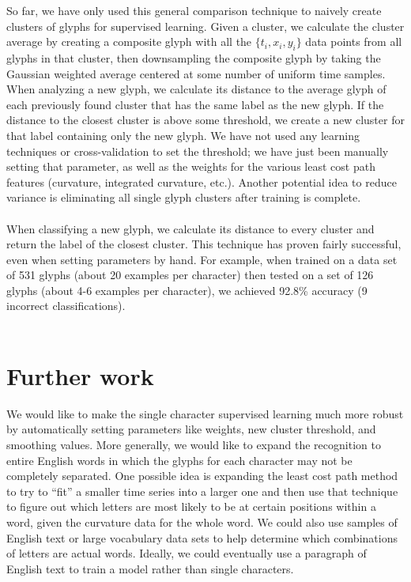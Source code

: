 \documentclass[journal]{IEEEtran}
\begin{document}
So far, we have only used this general comparison technique to naively create clusters of glyphs for supervised learning. Given a cluster, we calculate the cluster average by creating a composite glyph with all the $\{t_i,x_i,y_i\}$ data points from all glyphs in that cluster, then downsampling the composite glyph by taking the Gaussian weighted average centered at some number of uniform time samples. When analyzing a new glyph, we calculate its distance to the average glyph of each previously found cluster that has the same label as the new glyph. If the distance to the closest cluster is above some threshold, we create a new cluster for that label containing only the new glyph. We have not used any learning techniques or cross-validation to set the threshold; we have just been manually setting that parameter, as well as the weights for the various least cost path features (curvature, integrated curvature, etc.). Another potential idea to reduce variance is eliminating all single glyph clusters after training is complete.\\\\
When classifying a new glyph, we calculate its distance to every cluster and return the label of the closest cluster. This technique has proven fairly successful, even when setting parameters by hand. For example, when trained on a data set of 531 glyphs (about 20 examples per character) then tested on a set of 126 glyphs (about 4-6 examples per character), we achieved 92.8\% accuracy (9 incorrect classifications).\\\\

\section{Further work}
We would like to make the single character supervised learning much more robust by automatically setting parameters like weights, new cluster threshold, and smoothing values. More generally, we would like to expand the recognition to entire English words in which the glyphs for each character may not be completely separated. One possible idea is expanding the least cost path method to try to ``fit'' a smaller time series into a larger one and then use that technique to figure out which letters are most likely to be at certain positions within a word, given the curvature data for the whole word. We could also use samples of English text or large vocabulary data sets to help determine which combinations of letters are actual words. Ideally, we could eventually use a paragraph of English text to train a model rather than single characters.
\end{document}
